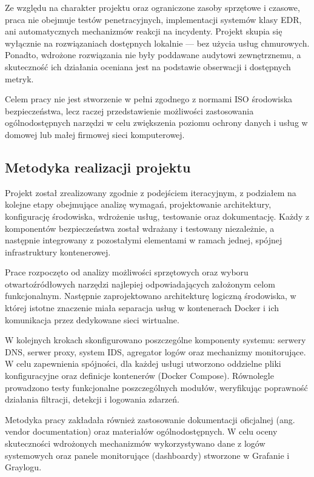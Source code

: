 \documentclass[
    left=2.5cm,         %
    right=2.5cm,        %
    top=2.5cm,          %
    bottom=3cm,         %
    bindingoffset=6mm,  %
    nohyphenation=true %
]{eiti/eiti-thesis} %
\begin{document}
Ze względu na charakter projektu oraz ograniczone zasoby sprzętowe i czasowe, praca nie obejmuje testów penetracyjnych, implementacji systemów klasy EDR, ani automatycznych mechanizmów reakcji na incydenty. Projekt skupia się wyłącznie na rozwiązaniach dostępnych lokalnie — bez użycia usług chmurowych. Ponadto, wdrożone rozwiązania nie były poddawane audytowi zewnętrznemu, a skuteczność ich działania oceniana jest na podstawie obserwacji i dostępnych metryk.

Celem pracy nie jest stworzenie w pełni zgodnego z normami ISO środowiska bezpieczeństwa, lecz raczej przedstawienie możliwości zastosowania ogólnodostępnych narzędzi w celu zwiększenia poziomu ochrony danych i usług w domowej lub małej firmowej sieci komputerowej.

\subsection{Metodyka realizacji projektu}

Projekt został zrealizowany zgodnie z podejściem iteracyjnym, z podziałem na kolejne etapy obejmujące analizę wymagań, projektowanie architektury, konfigurację środowiska, wdrożenie usług, testowanie oraz dokumentację. Każdy z komponentów bezpieczeństwa został wdrażany i testowany niezależnie, a następnie integrowany z pozostałymi elementami w ramach jednej, spójnej infrastruktury kontenerowej.

Prace rozpoczęto od analizy możliwości sprzętowych oraz wyboru otwartoźródłowych narzędzi najlepiej odpowiadających założonym celom funkcjonalnym. Następnie zaprojektowano architekturę logiczną środowiska, w której istotne znaczenie miała separacja usług w kontenerach Docker i ich komunikacja przez dedykowane sieci wirtualne.

W kolejnych krokach skonfigurowano poszczególne komponenty systemu: serwery DNS, serwer proxy, system IDS, agregator logów oraz mechanizmy monitorujące. W celu zapewnienia spójności, dla każdej usługi utworzono oddzielne pliki konfiguracyjne oraz definicje kontenerów (Docker Compose)\cite{lukaszfd_dockercompose2024}. Równolegle prowadzono testy funkcjonalne poszczególnych modułów, weryfikując poprawność działania filtracji, detekcji i logowania zdarzeń.

Metodyka pracy zakładała również zastosowanie dokumentacji oficjalnej (ang. vendor documentation) oraz materiałów ogólnodostępnych. W celu oceny skuteczności wdrożonych mechanizmów wykorzystywano dane z logów systemowych oraz panele monitorujące (dashboardy) stworzone w Grafanie i Graylogu.
\end{document}
